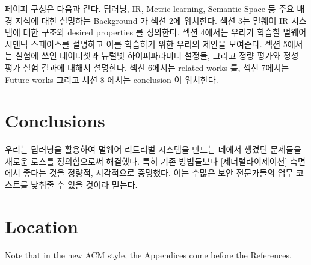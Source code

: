 페이퍼 구성은 다음과 같다. 딥러닝, IR, Metric learning, Semantic Space 등 주요 배경 지식에 대한 설명하는 Background 가 섹션 2에 위치한다. 섹션 3는 멀웨어 IR 시스템에 대한 구조와 desired properties 를 정의한다. 섹션 4에서는 우리가 학습할 멀웨어 시멘틱 스페이스를 설명하고 이를 학습하기 위한 우리의 제안을 보여준다. 섹션 5에서는 실험에 쓰인 데이터셋과 뉴럴넷 하이퍼파라미터 설정들, 그리고 정량 평가와 정성 평가 실험 결과에 대해서 설명한다. 섹션 6에서는 related works 를, 섹션 7에서는 Future works 그리고 세션 8 에서는 conclusion 이 위치한다. 








\section{Conclusions}

우리는 딥러닝을 활용하여 멀웨어 리트리벌 시스템을 만드는 데에서 생겼던 문제들을 새로운 로스를 정의함으로써 해결했다. 특히 기존 방법들보다 [제너럴라이제이션] 측면에서 좋다는 것을 정량적, 시각적으로 증명했다. 이는 수많은 보안 전문가들의 업무 코스트를 낮춰줄 수 있을 것이라 믿는다.

\appendix

\section{Location}

Note that in the new ACM style, the Appendices come before the References.


\begin{acks}
\end{acks}
